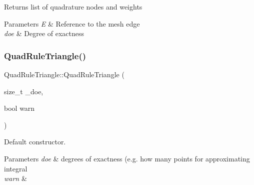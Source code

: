 \begin{DoxyReturn}{Returns}
list of quadrature nodes and weights 
\end{DoxyReturn}

\begin{DoxyParams}{Parameters}
{\em E} & Reference to the mesh edge \\
\hline
{\em doe} & Degree of exactness \\
\hline
\end{DoxyParams}
\mbox{\label{group__Quadratures_ga0d95447bb72cfc1b19cd2ea192ff6695}} 
\subsubsection{\texorpdfstring{Quad\+Rule\+Triangle()}{QuadRuleTriangle()}}
{\footnotesize\ttfamily Quad\+Rule\+Triangle\+::\+Quad\+Rule\+Triangle (\begin{DoxyParamCaption}\item[{size\+\_\+t}]{\+\_\+doe,  }\item[{bool}]{warn }\end{DoxyParamCaption})}



Default constructor. 


\begin{DoxyParams}{Parameters}
{\em doe} & degrees of exactness (e.\+g. how many points for approximating integral \\
\hline
{\em warn} & \\
\hline
\end{DoxyParams}
